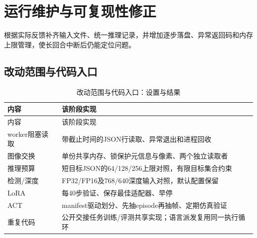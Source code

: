 
\FloatBarrier

\section{运行维护与可复现性修正}

\label{stage:s18}

根据实际反馈补齐输入文件、统一推理记录，并增加逐步落盘、异常返回码和内存上限管理，使长回合中断后仍能定位问题。

\subsection{改动范围与代码入口}\label{s18-detail-1}

\FloatBarrier\begingroup\small\setlength{\tabcolsep}{2.5pt}
\begin{longtable}[]{@{}
  >{\raggedright\arraybackslash}p{}
  >{\raggedright\arraybackslash}p{}@{}}
\caption{改动范围与代码入口：设置与结果}\label{tab:s18-1}\tabularnewline
\toprule\noalign{}
\begin{minipage}[b]{\linewidth}\raggedright
内容
\end{minipage} & \begin{minipage}[b]{\linewidth}\raggedright
该阶段实现
\end{minipage} \\
\midrule\noalign{}
\endfirsthead
\toprule\noalign{}
\begin{minipage}[b]{\linewidth}\raggedright
内容
\end{minipage} & \begin{minipage}[b]{\linewidth}\raggedright
该阶段实现
\end{minipage} \\
\midrule\noalign{}
\endhead
\bottomrule\noalign{}
\endlastfoot
worker阻塞读取 & 带截止时间的JSON行读取、异常退出和进程回收 \\
图像交换 & 单份共享内存、锁保护元信息与像素、两个独立读取者 \\
推理预算 & 短目标JSON的64/128/256上限对照，有限目标集合约束 \\
检测/深度 & FP32/FP16及768/640深度输入对照，默认配置保留 \\
LoRA & 每40步验证、保存最佳适配器、早停 \\
ACT & manifest驱动划分、先抽episode再抽帧、定期仿真验证 \\
重复代码 & 公开交接任务训练/评测共享实现；语言派发复用同一执行循环 \\
\end{longtable}\endgroup

